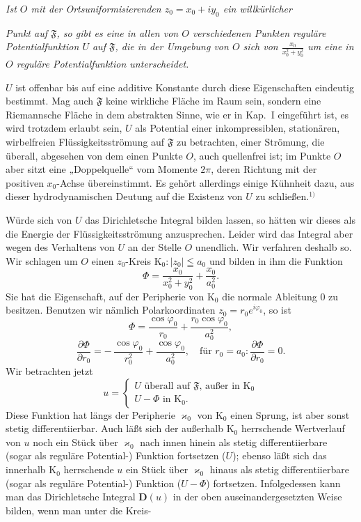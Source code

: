 \documentclass{article}
\begin{document}
\emph{Ist $O$ mit der Ortsuniformisierenden $z_0 = x_0 + i y_0$ ein willkürlicher}

\emph{Punkt auf $\mathfrak{F}$, so gibt es eine in allen von $O$ verschiedenen Punkten reguläre Potentialfunktion $U$ auf $\mathfrak{F}$, die in der Umgebung von $O$ sich von $\frac{x_0}{x_0^2 + y_0^2}$ um eine in $O$ reguläre Potentialfunktion unterscheidet.}

$U$ ist offenbar bis auf eine additive Konstante durch diese Eigenschaften eindeutig bestimmt. Mag auch $\mathfrak{F}$ keine wirkliche Fläche im Raum sein, sondern eine Riemannsche Fläche in dem abstrakten Sinne, wie er in Kap.~I eingeführt ist, es wird trotzdem erlaubt sein, $U$ als Potential einer inkompressiblen, stationären, wirbelfreien Flüssigkeitsströmung auf $\mathfrak{F}$ zu betrachten, einer Strömung, die überall, abgesehen von dem einen Punkte $O$, auch quellenfrei ist; im Punkte $O$ aber sitzt eine „Doppelquelle“ vom Momente $2\pi$, deren Richtung mit der positiven $x_0$-Achse übereinstimmt. Es gehört allerdings einige Kühnheit dazu, aus dieser hydrodynamischen Deutung auf die Existenz von $U$ zu schließen.${}^{1)}$

Würde sich von $U$ das Dirichletsche Integral bilden lassen, so hätten wir dieses als die Energie der Flüssigkeitsströmung anzusprechen. Leider wird das Integral aber wegen des Verhaltens von $U$ an der Stelle $O$ unendlich. Wir verfahren deshalb so. Wir schlagen um $O$ einen $z_0$-Kreis $\mathrm{K}_0\colon |z_0| \leqq a_0$ und bilden in ihm die Funktion
\[ \Phi = \frac{x_0}{x_0^2 + y_0^2} + \frac{x_0}{a_0^2}. \]
Sie hat die Eigenschaft, auf der Peripherie von $\mathrm{K}_0$ die normale Ableitung $0$ zu besitzen. Benutzen wir nämlich Polarkoordinaten $z_0 = r_0 e^{i\varphi_0}$, so ist
\[ \Phi = \frac{\cos\varphi_0}{r_0} + \frac{r_0 \cos\varphi_0}{a_0^2}, \]
\[ \frac{\partial\Phi}{\partial r_0} = -\,\frac{\cos\varphi_0}{r_0^2} + \frac{\cos\varphi_0}{a_0^2}, \quad \text{für } r_0 = a_0\colon \frac{\partial\Phi}{\partial r_0} = 0. \]
Wir betrachten jetzt
\[ u = \begin{cases}
U \text{ überall auf } \mathfrak{F}\text{, außer in } \mathrm{K}_0 \\
U - \Phi \text{ in } \mathrm{K}_0.
\end{cases} \]
Diese Funktion hat längs der Peripherie $\varkappa_0$ von $\mathrm{K}_0$ einen Sprung, ist aber sonst stetig differentiierbar. Auch läßt sich der außerhalb $\mathrm{K}_0$ herrschende Wertverlauf von $u$ noch ein Stück über $\varkappa_0$ nach innen hinein als stetig differentiierbare (sogar als reguläre Potential-) Funktion fortsetzen ($U$); ebenso läßt sich das innerhalb $\mathrm{K}_0$ herrschende $u$ ein Stück über $\varkappa_0$ hinaus als stetig differentiierbare (sogar als reguläre Potential-) Funktion ($U - \Phi$) fortsetzen. Infolgedessen kann man das Dirichletsche Integral $\mathbf{D}(u)$ in der oben auseinandergesetzten Weise bilden, wenn man unter die Kreis-
\end{document}
